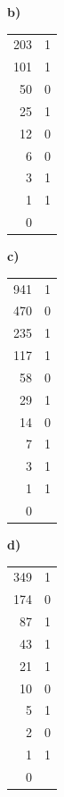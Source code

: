 \begin{esercizio}[8]
\begin{solution}
{\begin{minipage}[t]{0.24\linewidth}
  \textbf{b)}\\[2pt]
  {\small\renewcommand{\arraystretch}{1.0}\begin{tabular}{r|l}
    203 & 1\\
    101 & 1\\
    50 & 0\\
    25 & 1\\
    12 & 0\\
    6 & 0\\
    3 & 1\\
    1 & 1\\
    0 & \\
  \end{tabular}}
  \end{minipage}\hfill
  \begin{minipage}[t]{0.24\linewidth}
  \textbf{c)}\\[2pt]
  {\small\renewcommand{\arraystretch}{1.0}\begin{tabular}{r|l}
    941 & 1\\
    470 & 0\\
    235 & 1\\
    117 & 1\\
    58 & 0\\
    29 & 1\\
    14 & 0\\
    7 & 1\\
    3 & 1\\
    1 & 1\\
    0 & \\
  \end{tabular}}
  \end{minipage}\hfill
  \begin{minipage}[t]{0.24\linewidth}
  \textbf{d)}\\[2pt]
  {\small\renewcommand{\arraystretch}{1.0}\begin{tabular}{r|l}
    349 & 1\\
    174 & 0\\
    87 & 1\\
    43 & 1\\
    21 & 1\\
    10 & 0\\
    5 & 1\\
    2 & 0\\
    1 & 1\\
    0 & \\
  \end{tabular}}
  \end{minipage}\\[6pt]
}
\end{solution}
\end{esercizio}
